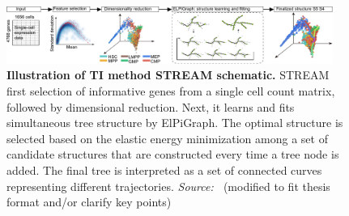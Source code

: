 \begin{figure}[ht!]
	\centering
	\includegraphics[width=0.95\textwidth]{TI_Alg_STREAM/fig}
	\vspace{0.1cm}
	\caption[Illustration of TI method STREAM schematic.]{\textbf{Illustration of TI method STREAM schematic.} STREAM first selection of informative genes from a single cell count matrix, followed by dimensional reduction. Next, it learns and fits simultaneous tree structure by ElPiGraph. The optimal structure is selected based on the elastic energy minimization among a set of candidate structures that are constructed every time a tree node is added. The final tree is interpreted as a set of connected curves representing different trajectories. \emph{Source: ~\cite{chen2019stream}}(modified to fit thesis format and/or clarify key points)
	}
	\label{fig:TI_Alg_STREAM}
\end{figure}





